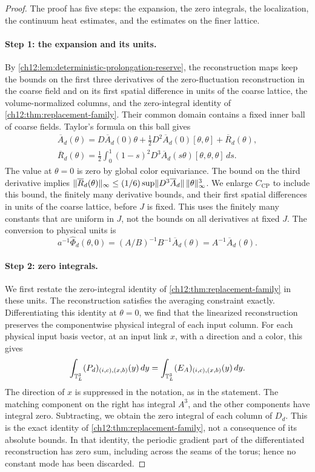 \begin{proof}
The proof has five steps: the expansion, the zero integrals, the localization, the continuum heat estimates, and the estimates on the finer lattice.

\paragraph{Step 1: the expansion and its units.}
By \cref{ch12:lem:deterministic-prolongation-reserve}, the reconstruction maps keep the bounds on the first three derivatives of the zero-fluctuation reconstruction in the coarse field and on its first spatial difference in units of the coarse lattice, the volume-normalized columns, and the zero-integral identity of \cref{ch12:thm:replacement-family}. Their common domain contains a fixed inner ball of coarse fields. Taylor's formula on this ball gives
\[
 \begin{gathered}
 \overline A_d(\theta)=D\overline A_d(0)\theta+\tfrac12D^2\overline A_d(0)[\theta,\theta]+\overline R_d(\theta),\\
 \overline R_d(\theta)=\tfrac12\int_0^1(1-s)^2D^3\overline A_d(s\theta)[\theta,\theta,\theta]\,ds.
 \end{gathered}
\]
The value at $\theta=0$ is zero by global color equivariance. The bound on the third derivative implies $\lVert \overline R_d(\theta)\rVert_\infty\le(1/6)\sup\lVert D^3\overline A_d\rVert\,\lVert \theta\rVert_\infty^3$. We enlarge $C_{\mathrm{CP}}$ to include this bound, the finitely many derivative bounds, and their first spatial differences in units of the coarse lattice, before $J$ is fixed. This uses the finitely many constants that are uniform in $J$, not the bounds on all derivatives at fixed $J$. The conversion to physical units is
\begin{equation}\label{ch14:eq:center-units}
 a^{-1}\widehat\Phi_d(\theta,0)=(A/B)^{-1}B^{-1}\overline A_d(\theta)=A^{-1}\overline A_d(\theta).
\end{equation}

\paragraph{Step 2: zero integrals.}
We first restate the zero-integral identity of \cref{ch12:thm:replacement-family} in these units. The reconstruction satisfies the averaging constraint exactly. Differentiating this identity at $\theta=0$, we find that the linearized reconstruction preserves the componentwise physical integral of each input column. For each physical input basis vector, at an input link $x$, with a direction and a color, this gives
\[
 \int_{\mathbb T_L^3}(P_d)_{(i,c),(x,b)}(y)\,dy=\int_{\mathbb T_L^3}(E_A)_{(i,c),(x,b)}(y)\,dy.
\]
The direction of $x$ is suppressed in the notation, as in the statement. The matching component on the right has integral $A^3$, and the other components have integral zero. Subtracting, we obtain the zero integral of each column of $D_d$. This is the exact identity of \cref{ch12:thm:replacement-family}, not a consequence of its absolute bounds. In that identity, the periodic gradient part of the differentiated reconstruction has zero sum, including across the seams of the torus; hence no constant mode has been discarded.


\end{proof}
